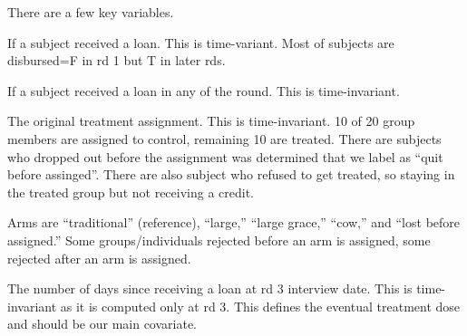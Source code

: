 There are a few key variables.
\begin{description}
\vspace{1.0ex}\setlength{\itemsep}{1.0ex}\setlength{\baselineskip}{12pt}
\item[disbursed] If a subject received a loan. This is time-variant. Most of subjects are \textsf{disbursed}=F in rd 1 but T in later rds.
\item[receivedCredit] If a subject received a loan in any of the round. This is time-invariant. 
\item[assignment] The original treatment assignment. This is time-invariant. 10 of 20 group members are assigned to control, remaining 10 are treated. There are subjects who dropped out before the \textsf{assignment} was determined that we label as ``quit before assinged''. There are also subject who refused to get treated, so staying in the treated group but not receiving a credit.
\item[arm]	Arms are ``traditional'' (reference), ``large,'' ``large grace,'' ``cow,'' and ``lost before assigned.'' Some groups/individuals rejected before an arm is assigned, some rejected after an arm is assigned. 
\item[elapsed] The number of days since receiving a loan at rd 3 interview date. This is time-invariant as it is computed only at rd 3. This defines the eventual treatment dose and should be our main covariate.
\end{description}

